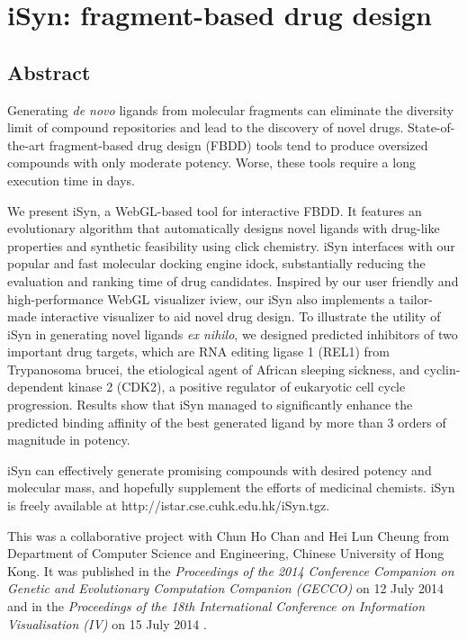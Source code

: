 \chapter{iSyn: fragment-based drug design}

\section{Abstract}

Generating \textit{de novo} ligands from molecular fragments can eliminate the diversity limit of compound repositories and lead to the discovery of novel drugs. State-of-the-art fragment-based drug design (FBDD) tools tend to produce oversized compounds with only moderate potency. Worse, these tools require a long execution time in days.

We present iSyn, a WebGL-based tool for interactive FBDD. It features an evolutionary algorithm that automatically designs novel ligands with drug-like properties and synthetic feasibility using click chemistry. iSyn interfaces with our popular and fast molecular docking engine idock, substantially reducing the evaluation and ranking time of drug candidates. Inspired by our user friendly and high-performance WebGL visualizer iview, our iSyn also implements a tailor-made interactive visualizer to aid novel drug design. To illustrate the utility of iSyn in generating novel ligands \textit{ex nihilo}, we designed predicted inhibitors of two important drug targets, which are RNA editing ligase 1 (REL1) from Trypanosoma brucei, the etiological agent of African sleeping sickness, and cyclin-dependent kinase 2 (CDK2), a positive regulator of eukaryotic cell cycle progression. Results show that iSyn managed to significantly enhance the predicted binding affinity of the best generated ligand by more than 3 orders of magnitude in potency.

iSyn can effectively generate promising compounds with desired potency and molecular mass, and hopefully supplement the efforts of medicinal chemists. iSyn is freely available at http://istar.cse.cuhk.edu.hk/iSyn.tgz.

This was a collaborative project with Chun Ho Chan and Hei Lun Cheung from Department of Computer Science and Engineering, Chinese University of Hong Kong. It was published in the \textit{Proceedings of the 2014 Conference Companion on Genetic and Evolutionary Computation Companion (GECCO)} on 12 July 2014 \citep{1409} and in the \textit{Proceedings of the 18th International Conference on Information Visualisation (IV)} on 15 July 2014 \citep{1387}.

